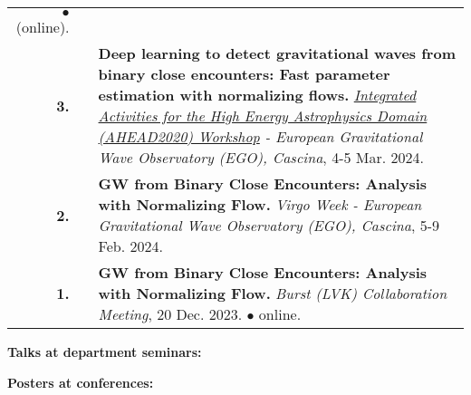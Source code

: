 {\begin{longtable}{rp{0.3cm}p{15.8cm}}
\newline{}
\textcolor{color1}{$\bullet$} (online).
\vspace{0.05cm}\\
%
\textbf{3.} &  & \textbf{Deep learning to detect gravitational waves from binary close encounters: Fast parameter estimation with normalizing flows.}
\newline{}
\textit{\href{https://indico.ego-gw.it/event/666/overview}{Integrated Activities for the High Energy Astrophysics Domain (AHEAD2020) Workshop} - European Gravitational Wave Observatory (EGO), Cascina}, 4-5 Mar. 2024.
\vspace{0.05cm}\\
%
\textbf{2.} &  & \textbf{GW from Binary Close Encounters: Analysis with Normalizing Flow.}
\newline{}
\textit{Virgo Week - European Gravitational Wave Observatory (EGO), Cascina}, 5-9 Feb. 2024.
\vspace{0.05cm}\\
%
\textbf{1.} &  & \textbf{GW from Binary Close Encounters: Analysis with Normalizing Flow.}
\newline{}
\textit{Burst (LVK) Collaboration Meeting}, 20 Dec. 2023.
\newline{}
\textcolor{color1}{$\bullet$} online.
\vspace{0.05cm}\\
%
\end{longtable} }
\textcolor{color1}{\textbf{Talks at department seminars:}}
\vspace{-0.5cm}

\textcolor{color1}{\textbf{Posters at conferences:}}
\vspace{-0.5cm}

